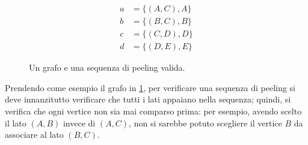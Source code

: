 \begin{figure}[htpb]
	\begin{center}
		\begin{subfigure}[b]{0.45\textwidth}
			\begin{center}

			\end{center}
		\end{subfigure}
		\begin{subfigure}[b]{0.45\textwidth}
			\begin{center}
				\begin{align*}
					a & = \{(A, C), A\} \\
					b & = \{(B, C), B\} \\
					c & = \{(C, D), D\} \\
					d & = \{(D, E), E\}
				\end{align*}
			\end{center}
		\end{subfigure}
	\end{center}
	\caption{Un grafo e una sequenza di peeling valida.}%
	\label{fig:example_peeling}
\end{figure}

Prendendo come esempio il grafo in \cref{fig:example_peeling}, per verificare una
sequenza di peeling si deve innanzitutto verificare che tutti i lati
appaiano nella sequenza; quindi, si verifica che ogni vertice non sia mai
comparso prima: per esempio, avendo scelto il lato $(A,B)$ invece di $(A,C)$,
non si sarebbe potuto scegliere il vertice $B$ da associare al lato $(B,C)$.

